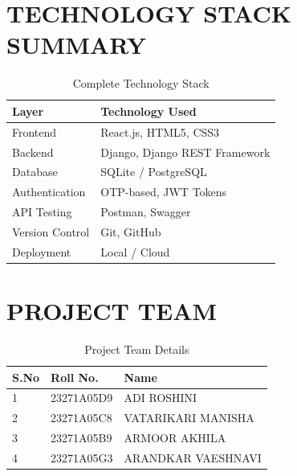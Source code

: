\documentclass[12pt,a4paper,oneside]{report}
\numberwithin{figure}{chapter}
\numberwithin{table}{chapter}
\begin{document}
\section{TECHNOLOGY STACK SUMMARY}

\begin{table}[H]
  \centering
  \caption{Complete Technology Stack}
  \begin{tabularx}{0.85\textwidth}{|l|X|}
    \hline
    \textbf{Layer}       & \textbf{Technology Used}     \\
    \hline
    Frontend             & React.js, HTML5, CSS3        \\
    \hline
    Backend              & Django, Django REST Framework \\
    \hline
    Database             & SQLite / PostgreSQL           \\
    \hline
    Authentication       & OTP-based, JWT Tokens         \\
    \hline
    API Testing          & Postman, Swagger              \\
    \hline
    Version Control      & Git, GitHub                  \\
    \hline
    Deployment           & Local / Cloud                \\
    \hline
  \end{tabularx}
  \label{tab:techstack}
\end{table}

\section{PROJECT TEAM}

\begin{table}[H]
  \centering
  \caption{Project Team Details}
  \begin{tabularx}{0.85\textwidth}{|l|l|X|}
    \hline
    \textbf{S.No} & \textbf{Roll No.} & \textbf{Name} \\
    \hline
    1 & 23271A05D9 & ADI ROSHINI \\
    \hline
    2 & 23271A05C8 & VATARIKARI MANISHA \\
    \hline
    3 & 23271A05B9 & ARMOOR AKHILA \\
    \hline
    4 & 23271A05G3 & ARANDKAR VAESHNAVI \\
    \hline
  \end{tabularx}
  \label{tab:team}
\end{table}

\end{document}
